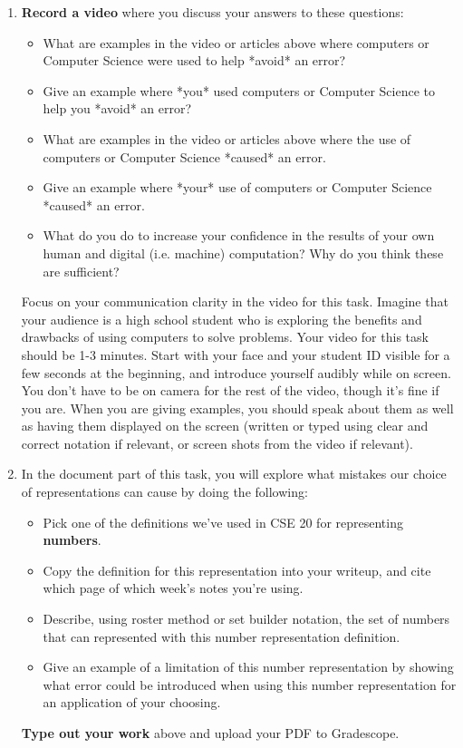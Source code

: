 \documentclass[12pt, oneside]{article}
\begin{document}
\begin{enumerate}
    \item {\bf Record a video} where you discuss your answers to these questions:
    \begin{itemize}
        \item What are examples in the video or articles above where computers or Computer Science were used
        to help *avoid* an error?
        \item Give an example where *you* used computers or Computer Science 
        to help you *avoid* an error?
        \item What are examples in the video or articles above where the use of computers or Computer Science
         *caused* an error.
        \item Give an example where *your* use of computers or Computer Science 
        *caused* an error.
        \item What do you do to increase your confidence in the results of your own human and digital 
        (i.e. machine) computation? Why do you think these are sufficient?
     \end{itemize}
    Focus on your communication clarity in the video for this task. Imagine that your audience is a high school student
    who is exploring the benefits and drawbacks of using computers to solve problems.
    Your video for this task should be 1-3 minutes. Start with 
    your face and your student ID visible for a few seconds at the beginning, and introduce yourself audibly while on screen. 
    You don't have to be on camera for the rest of the video, though it's fine if you are. 
    When you are giving examples, you should speak about them as well as having them 
    displayed on the screen (written or typed using clear and correct notation if relevant, or screen shots from 
    the video if relevant).
    
    \item In the document part of this task, you will explore what mistakes our choice of representations can cause by doing the following:
    \begin{itemize}
        \item Pick one of the definitions we've used in CSE 20 for representing {\bf numbers}. 
        \item Copy the definition for this representation into your writeup, and cite 
        which page of which week's notes you're using.
        \item Describe, using roster method or set builder notation, the set of numbers that can represented 
        with this number representation definition.
        \item Give an example of a limitation of this number representation by showing 
        what error could be introduced when using this number representation for an application of your choosing.
    \end{itemize}
    {\bf Type out your work} above and upload your PDF to Gradescope.
    \end{enumerate}
\end{document}
